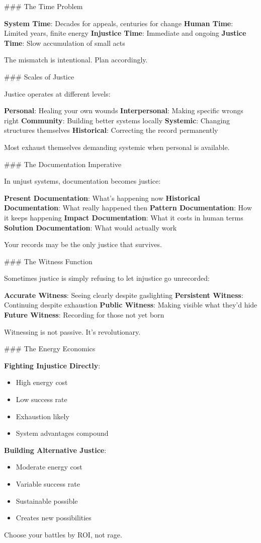 \documentclass[12pt]{book}
\begin{document}
\#\#\# The Time Problem

\textbf{System Time}: Decades for appeals, centuries for change
\textbf{Human Time}: Limited years, finite energy
\textbf{Injustice Time}: Immediate and ongoing
\textbf{Justice Time}: Slow accumulation of small acts

The mismatch is intentional. Plan accordingly.

\#\#\# Scales of Justice

Justice operates at different levels:

\textbf{Personal}: Healing your own wounds
\textbf{Interpersonal}: Making specific wrongs right
\textbf{Community}: Building better systems locally
\textbf{Systemic}: Changing structures themselves
\textbf{Historical}: Correcting the record permanently

Most exhaust themselves demanding systemic when personal is available.

\#\#\# The Documentation Imperative

In unjust systems, documentation becomes justice:

\textbf{Present Documentation}: What's happening now
\textbf{Historical Documentation}: What really happened then
\textbf{Pattern Documentation}: How it keeps happening
\textbf{Impact Documentation}: What it costs in human terms
\textbf{Solution Documentation}: What would actually work

Your records may be the only justice that survives.

\#\#\# The Witness Function

Sometimes justice is simply refusing to let injustice go unrecorded:

\textbf{Accurate Witness}: Seeing clearly despite gaslighting
\textbf{Persistent Witness}: Continuing despite exhaustion
\textbf{Public Witness}: Making visible what they'd hide
\textbf{Future Witness}: Recording for those not yet born

Witnessing is not passive. It's revolutionary.

\#\#\# The Energy Economics

\textbf{Fighting Injustice Directly}:
\begin{itemize}
\item High energy cost
\item Low success rate
\item Exhaustion likely
\item System advantages compound

\end{itemize}
\textbf{Building Alternative Justice}:
\begin{itemize}
\item Moderate energy cost
\item Variable success rate
\item Sustainable possible
\item Creates new possibilities

\end{itemize}
Choose your battles by ROI, not rage.
\end{document}
